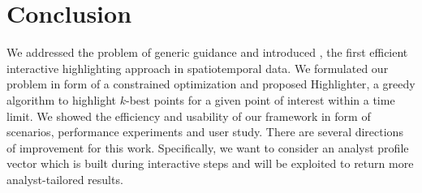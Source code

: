 \section{Conclusion}
\label{sec:conc}
We addressed the problem of generic guidance and introduced \framework, the first efficient interactive highlighting approach in spatiotemporal data. We formulated our problem in form of a constrained optimization and proposed {\sc Highlighter}, a greedy algorithm to highlight $k$-best points for a given point of interest within a time limit. We showed the efficiency and usability of our framework in form of scenarios, performance experiments and user study. There are several directions of improvement for this work. Specifically, we want to consider an analyst profile vector which is built during interactive steps and will be exploited to return more analyst-tailored results.